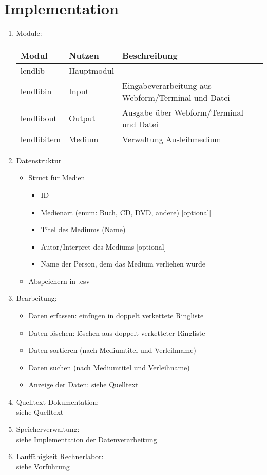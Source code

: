 \section{Implementation}
\begin{enumerate}
\item Module:\\
\begin{tabular}{l l l}
Modul & Nutzen & Beschreibung\\
\hline
lendlib & Hauptmodul & \\
lendlibin & Input & Eingabeverarbeitung aus Webform/Terminal und Datei\\
lendlibout & Output & Ausgabe über Webform/Terminal und Datei\\
lendlibitem & Medium & Verwaltung Ausleihmedium\\
\end{tabular}
\item Datenstruktur
\begin{itemize}
\item Struct für Medien
\begin{itemize}
\item ID
\item Medienart (enum: Buch, CD, DVD, andere) [optional]
\item Titel des Mediums (Name)
\item Autor/Interpret des Mediums [optional]
\item Name der Person, dem das Medium verliehen wurde
\end{itemize}
\item Abspeichern in .csv
\end{itemize}
\item Bearbeitung:
\begin{itemize}
\item Daten erfassen: einfügen in doppelt verkettete Ringliste
\item Daten löschen: löschen aus doppelt verketteter Ringliste
\item Daten sortieren (nach Mediumtitel und Verleihname)
\item Daten suchen (nach Mediumtitel und Verleihname)
\item Anzeige der Daten: siehe Quelltext
\end{itemize}
\item Quelltext-Dokumentation:\\
siehe Quelltext
\item Speicherverwaltung:\\
siehe Implementation der Datenverarbeitung
\item Lauffähigkeit Rechnerlabor:\\
siehe Vorführung
\end{enumerate}

